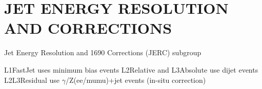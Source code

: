 %
%
%
%



\chapter{\texorpdfstring{\uppercase{Jet Energy Resolution and Corrections}}{Jet Energy Resolution and Corrections}}
\label{appendix:JERC}

Jet Energy Resolution and 1690 Corrections (JERC) subgroup

L1FastJet uses minimum bias events
L2Relative and L3Absolute use dijet events
L2L3Residual use $\gamma$/Z(ee/mumu)+jet events (in-situ correction)